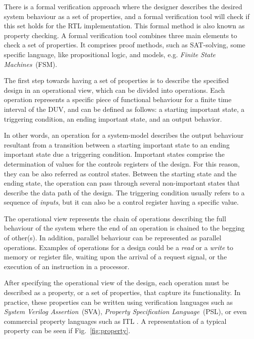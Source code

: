 There is a formal verification approach where the designer describes the desired system behaviour as a set of properties, and a formal verification tool will check if this set holds for the RTL implementation. This formal method is also known as property checking. A formal verification tool combines three main elements to check a set of properties. It comprises proof methods, such as SAT-solving, some specific language, like propositional logic, and models, e.g. \textit{Finite State Machines}~(FSM).


The first step towards having a set of properties is to describe the specified design in an operational view, which can be divided into operations. Each operation represents a specific piece of functional behaviour for a finite time interval of the DUV, and can be defined as follows: a starting important state, a triggering condition, an ending important state, and an output behavior.

In other words, an operation for a system-model describes the output behaviour resultant from a transition between a starting important state to an ending important state due a triggering condition. Important states comprise the determination of values for the controls registers of the design. For this reason, they can be also referred as control states. Between the starting state and the ending state, the operation can pass through several non-important states that describe the data path of the design. The triggering condition usually refers to a sequence of \textit{inputs}, but it can also be a control register having a specific value.

The operational view represents the chain of operations describing the full behaviour of the system where the end of an operation is chained to the begging of other(s). In addition, parallel behaviour can be represented as parallel operations. Examples of operations for a design could be a \textit{read} or a \textit{write} to memory or register file, waiting upon the arrival of a request signal, or the execution of an instruction in a processor.

After specifying the operational view of the design, each operation must be described as a property, or a set of properties, that capture its functionality. In practice, these properties can be written using verification languages such as \textit{System Verilog Assertion}~(SVA), \textit{Property Specification Language}~(PSL), or even commercial property languages such as ITL \cite{onespin}. A representation of a typical property can be seen if Fig.~\ref{fig:property}.

